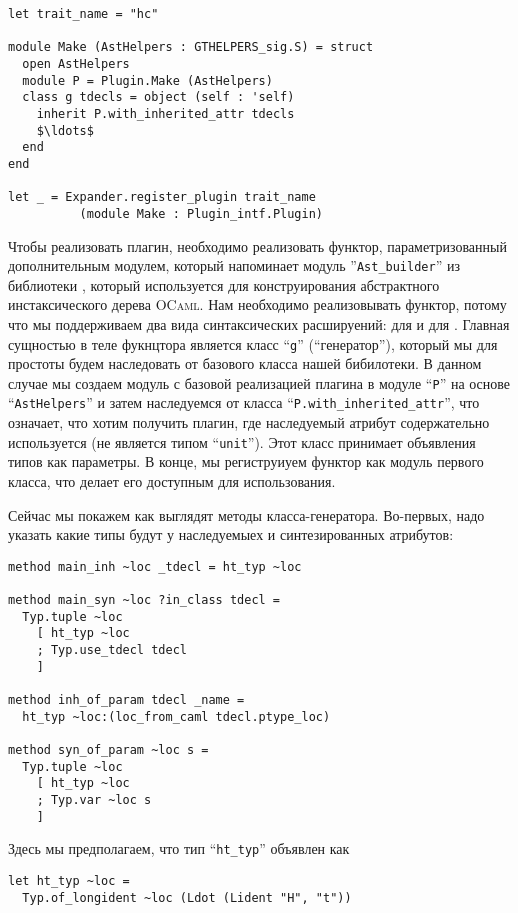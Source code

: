 \begin{lstlisting}
let trait_name = "hc"

module Make (AstHelpers : GTHELPERS_sig.S) = struct
  open AstHelpers
  module P = Plugin.Make (AstHelpers)
  class g tdecls = object (self : 'self)
    inherit P.with_inherited_attr tdecls 
    $\ldots$
  end
end

let _ = Expander.register_plugin trait_name 
          (module Make : Plugin_intf.Plugin)
\end{lstlisting}

Чтобы реализовать плагин, необходимо реализовать функтор, параметризованный дополнительным модулем, который напоминает модуль ''\texttt{Ast\_builder}'' из библиотеки 
, который используется для конструирования абстрактного инстаксического дерева  \textsc{OCaml}. Нам необходимо реализовывать функтор, потому что мы поддерживаем два вида синтаксических расшируений: для  и для . Главная сущностью в теле фукнцтора является класс ``\lstinline{g}'' (``генератор''), который мы для простоты будем наследовать от базового класса нашей бибилотеки.
В данном случае мы создаем модуль с базовой реализацией плагина в модуле 
``\lstinline{P}'' на основе ``\lstinline{AstHelpers}'' и затем наследуемся от класса 
``\lstinline{P.with_inherited_attr}'', что означает, что хотим получить плагин, где наследуемый атрибут содержательно используется (не является типом ``\lstinline|unit|'').
Этот класс принимает объявления типов как параметры.
В конце, мы региструиуем функтор как модуль первого класса, что делает его доступным для использования.

Сейчас мы покажем как выглядят методы класса-генератора. Во-первых, надо указать какие типы будут у наследуемыех и синтезированных атрибутов:

\begin{lstlisting}
method main_inh ~loc _tdecl = ht_typ ~loc

method main_syn ~loc ?in_class tdecl =
  Typ.tuple ~loc
    [ ht_typ ~loc
    ; Typ.use_tdecl tdecl
    ]

method inh_of_param tdecl _name =
  ht_typ ~loc:(loc_from_caml tdecl.ptype_loc)

method syn_of_param ~loc s =
  Typ.tuple ~loc
    [ ht_typ ~loc
    ; Typ.var ~loc s
    ]
\end{lstlisting}

Здесь мы предполагаем, что тип ``\lstinline{ht_typ}'' объявлен как

\begin{lstlisting}
let ht_typ ~loc =
  Typ.of_longident ~loc (Ldot (Lident "H", "t"))
\end{lstlisting}

